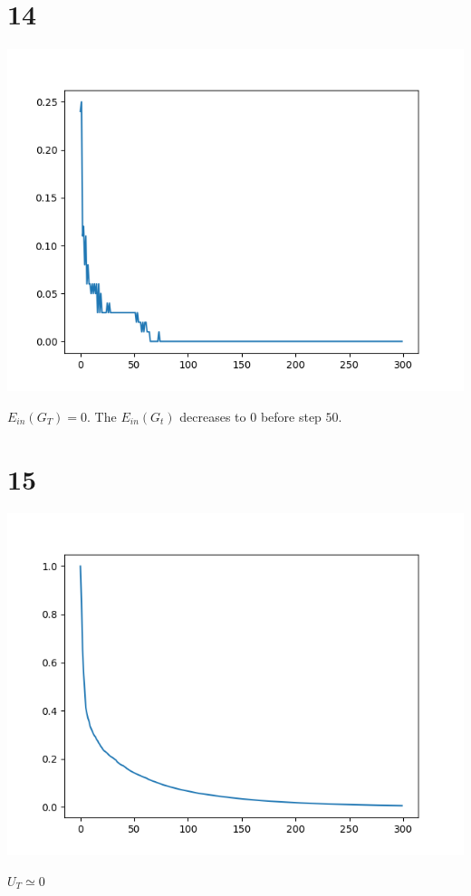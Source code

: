 \documentclass[12pt]{article}
\begin{document}
\section*{14}
\begin{center}
    \includegraphics[scale=0.5]{p14.png}
\end{center}
$E_{in}(G_T) = 0$. The $E_{in}(G_t)$ decreases to $0$ before step $50$.

\section*{15}
\begin{center}
    \includegraphics[scale=0.5]{p15.png}
\end{center}
$U_T \simeq 0$
\end{document}
